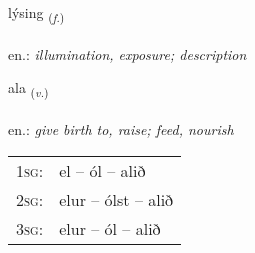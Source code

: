 \documentclass[frontgrid, backgrid]{flacards}\usepackage[]{graphicx}\usepackage[]{xcolor}
\begin{document}
\renewcommand{\flhead}{\vskip5pt \fboxsep=0pt {\small\bfseries\footnotesize Nafnorð | Noun}}
\renewcommand{\fcfoot}{\vskip5pt \fboxsep=0pt \hspace{2pt}{\small\bfseries\footnotesize 1K}}

\renewcommand{\blhead}{\vskip5pt {\small\bfseries\footnotesize Nafnorð | Noun }}
\renewcommand{\bcfoot}{\vskip5pt \hspace{2pt}{\small\bfseries\footnotesize 1K}}


{lýsing \small{\textsubscript{(\textit{f.})}} \\[1ex] %
\textphonetic{[liːsiŋk]} \\
en.: \emph{illumination, exposure; description} \\  [2ex]
\renewcommand*{\arraystretch}{0.8}
}

\renewcommand{\flhead}{\vskip5pt \fboxsep=0pt {\small\bfseries\footnotesize Sagnorð | Verb}}
\renewcommand{\fcfoot}{\vskip5pt \fboxsep=0pt \hspace{2pt}{\small\bfseries\footnotesize 1K}}

\renewcommand{\blhead}{\vskip5pt {\small\bfseries\footnotesize Sagnorð | Verb }}
\renewcommand{\bcfoot}{\vskip5pt \hspace{2pt}{\small\bfseries\footnotesize 1K}}


{ala \small{\textsubscript{(\textit{v.})}} \\[1ex] %
\textphonetic{[aːla]} \\
en.: \emph{give birth to, raise; feed, nourish} \\  [2ex]
\renewcommand*{\arraystretch}{0.8}
\begin{tabular}{p{1cm}l}
\textsc{1sg}: & el -- ól -- alið \\ 
\textsc{2sg}: & elur -- ólst -- alið \\ 
\textsc{3sg}: & elur -- ól -- alið \\ 
\end{tabular}
}
\end{document}
